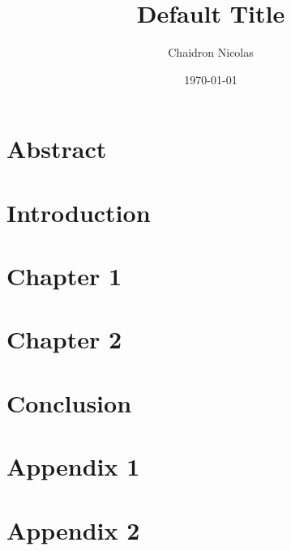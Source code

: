 \documentclass[a4paper]{book}
\title{Default Title}
\author{Chaidron Nicolas}
\date{\today}
\begin{document}
\maketitle

\tableofcontents

\chapter*{Abstract}

\chapter{Introduction}

\chapter{Chapter 1}





\chapter{Chapter 2}





\chapter{Conclusion}

\listoffigures %
 
\listoftables %

 

\appendix

\chapter{Appendix 1}

\chapter{Appendix 2}
\end{document}
